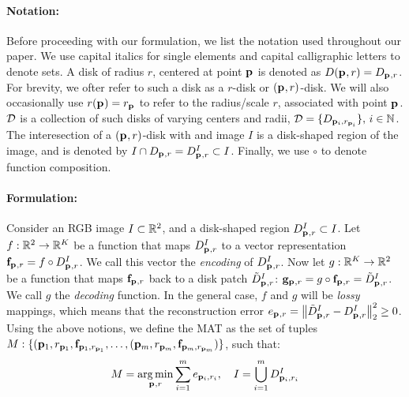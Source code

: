 \documentclass[10pt,twocolumn,letterpaper]{article}
\begin{document}
\paragraph{Notation:} Before proceeding with our formulation, we list the notation used throughout our paper.
We use capital italics for single elements and capital calligraphic letters to denote sets. A disk of radius $r$,
centered at point $\mathbf{p}_{}$ is denoted as $D(\mathbf{p}_{},r)=D_{\mathbf{p}_{},r}$. 
For brevity, we ofter refer to such a disk as a $r$-disk or $(\mathbf{p}_{},r)$-disk.
We will also occasionally use $r(\mathbf{p}_{}) = r_{\mathbf{p}_{}}$ to refer to the radius/scale $r$, associated with point $\mathbf{p}_{}$.
$\mathcal{D}$ is a collection of such disks of varying centers and radii, $\mathcal{D}=\{ D_{\mathbf{p}_{i},r_{\mathbf{p}_{i}}} \},\, i\in\mathbb{N}$.
The interesection of a $(\mathbf{p}_{},r)$-disk with and image $I$ is a disk-shaped region of the image, and is denoted by 
$I \cap D_{\mathbf{p}_{},r}=D_{\mathbf{p}_{},r}^I \subset I$. Finally, we use $\circ$ to denote function composition.

\paragraph{Formulation:} Consider an RGB image $I\subset\mathbb{R}^2$, and a disk-shaped region $D_{\mathbf{p}_{},r}^I \subset I$.
Let $f:\mathbb{R}^2 \rightarrow \mathbb{R}^K$ be a function that maps $D_{\mathbf{p}_{},r}^I$ to a vector representation $\mathbf{f}_{\mathbf{p}_{},r}=f\circ D_{\mathbf{p}_{},r}^I$. 
We call this vector the \emph{encoding} of $D_{\mathbf{p}_{},r}^I$. 
Now let $g:\mathbb{R}^K \rightarrow \mathbb{R}^2$ be a function that maps $\mathbf{f}_{\mathbf{p}_{},r}$ back to a disk patch $\tilde{D}_{\mathbf{p}_{},r}^I$: 
$\mathbf{g}_{\mathbf{p}_{},r} = g \circ \mathbf{f}_{\mathbf{p}_{},r} = \tilde{D}_{\mathbf{p}_{},r}^I$. We call $g$ the \emph{decoding} function.
In the general case, $f$ and $g$ will be \emph{lossy} mappings, which means that the reconstruction error 
$e_{\mathbf{p}_{},r} = \left \lVert  \tilde{D}_{\mathbf{p}_{},r}^I - D_{\mathbf{p}_{},r}^I \right \rVert_2^2 \geq 0$. 
Using the above notions, we define the MAT as the set of tuples 
$M:\{ ( \mathbf{p}_{1},r_{\mathbf{p}_{1}}, \mathbf{f}_{\mathbf{p}_{1},r_{\mathbf{p}_{1}}}, \ldots, ( \mathbf{p}_{m},r_{\mathbf{p}_{m}}, \mathbf{f}_{\mathbf{p}_{m},r_{\mathbf{p}_{m}}} ) \}$, such that:
\begin{equation}
M = \operatorname*{arg\,min}_{\mathbf{p}_{},r}{\sum_{i=1}^m e_{\mathbf{p}_{i},r_i}},\quad I=\bigcup_{i=1}^m D_{\mathbf{p}_{i},r_i}^I 
\label{eq:minimization}
\end{equation}
\end{document}
